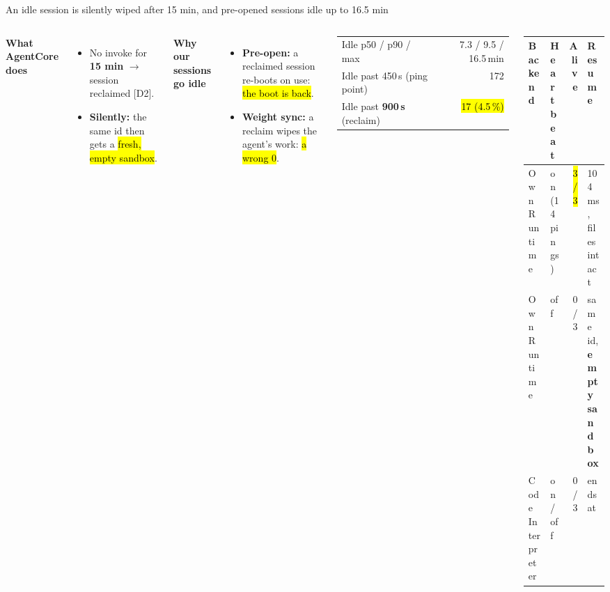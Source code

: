 \begin{frame}{An idle session is silently wiped after 15 min, and pre-opened sessions idle up to 16.5 min}
\begin{columns}[T]
\textbf{\footnotesize What AgentCore does}
\begin{itemize}\scriptsize\setlength{\itemsep}{0.8mm}
\item No invoke for \textbf{15 min} $\rightarrow$ session reclaimed [D2].
\item \textbf{Silently:} the same id then gets a \hl{fresh, empty sandbox}.
\end{itemize}
\textbf{\footnotesize Why our sessions go idle}
\begin{itemize}\scriptsize\setlength{\itemsep}{0.8mm}
\item \textbf{Pre-open:} a reclaimed session re-boots on use: \hl{the boot is back}.
\item \textbf{Weight sync:} a reclaim wipes the agent's work: \hl{a wrong 0}.
\end{itemize}
\scriptsize
\begin{tabularx}{\linewidth}{@{}Yr@{}}
\toprule
Idle p50 / p90 / max & 7.3 / 9.5 / 16.5\,min\\
Idle past 450\,s (ping point) & 172\\
Idle past \textbf{900\,s} (reclaim) & \hl{17 (4.5\,\%)}\\
\bottomrule
\end{tabularx}
\par\vspace{2mm}
\tiny\setlength{\tabcolsep}{3pt}
\begin{tabularx}{\linewidth}{@{}P{0.27\linewidth}P{0.2\linewidth}rY@{}}
\toprule
\textbf{Backend} & \textbf{Heartbeat} & \textbf{Alive} & \textbf{Resume}\\
\midrule
Own Runtime & on (14 pings) & \hl{3 / 3} & 104 ms, files intact\\
Own Runtime & off & 0 / 3 & same id, \textbf{empty sandbox}\\
Code Interpreter & on / off & 0 / 3 & ends at \\
\bottomrule
\end{tabularx}
\end{columns}
\end{frame}

